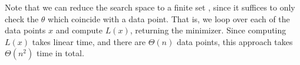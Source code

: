 \begin{soln}
    Note that we can reduce the search space to a finite set ,
    since it suffices to only check the $\theta$ which coincide
    with a data point.  That is, we loop over each of the data
    points $x$ and compute $L(x)$, returning the minimizer.
    Since computing $L(x)$ takes linear time, and there are
    $\Theta(n)$ data points, this approach takes $\Theta(n^2)$
    time in total.

    \inputminted{python}{\solutiondir/minimize_ell.py}
\end{soln}
